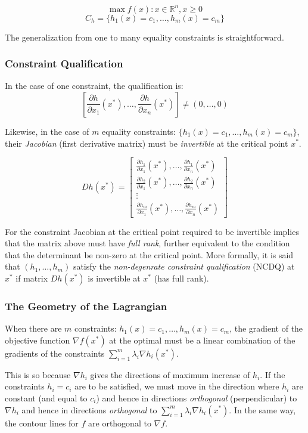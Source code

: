 \documentclass[11pt,]{article}
\begin{document}
\[
\max f(x): x\in \mathbb{R}^n, x\geq 0
\] \[
C_h = \{h_1(x)=c_1,\hdots, h_m(x)=c_m\}
\]

The generalization from one to many equality constraints is
straightforward.

\subsubsection{Constraint
Qualification}\label{constraint-qualification-1}

In the case of one constraint, the qualification is:
\[[\frac{\partial h}{\partial x_1}(x^*),\hdots,\frac{\partial h}{\partial x_n}(x^*)]\neq (0,\hdots,0)\]

Likewise, in the case of \(m\) equality constraints:
\(\{h_1(x)=c_1,\hdots, h_m(x)=c_m\}\), their \emph{Jacobian} (first
derivative matrix) must be \emph{invertible} at the critical point
\(x^*\).

\[
Dh(x^*) = \begin{bmatrix}
\frac{\partial h_1}{\partial x_1}(x^*),\hdots,\frac{\partial h_1}{\partial x_n}(x^*)\\
\frac{\partial h_2}{\partial x_1}(x^*),\hdots,\frac{\partial h_2}{\partial x_n}(x^*)\\
 \vdots \\
\frac{\partial h_m}{\partial x_1}(x^*),\hdots, \frac{\partial h_m}{\partial x_n}(x^*)
\end{bmatrix}
\]

For the constraint Jacobian at the critical point required to be
invertible implies that the matrix above must have \emph{full rank},
further equivalent to the condition that the determinant be non-zero at
the critical point. More formally, it is said that \((h_1,\hdots,h_m)\)
satisfy the \emph{non-degenrate constraint qualification} (NCDQ) at
\(x^*\) if matrix \(Dh(x^*)\) is invertible at \(x^*\) (has full rank).

\subsubsection{The Geometry of the
Lagrangian}\label{the-geometry-of-the-lagrangian}

When there are \(m\) constraints: \(h_1(x)=c_1,\hdots,h_m(x)=c_m\), the
gradient of the objective function \(\nabla f(x^*)\) at the optimal must
be a linear combination of the gradients of the constraints
\(\sum_{i=1}^m \lambda_i \nabla h_i(x^*)\).

This is so because \(\nabla h_i\) gives the directions of maximum
increase of \(h_i\). If the constraints \(h_i=c_i\) are to be satisfied,
we must move in the direction where \(h_i\) are constant (and equal to
\(c_i\)) and hence in directions \emph{orthogonal} (perpendicular) to
\(\nabla h_i\) and hence in directions \emph{orthogonal} to
\(\sum_{i=1}^m \lambda_i \nabla h_i(x^*)\). In the same way, the contour
lines for \(f\) are orthogonal to \(\nabla f\).
\end{document}
